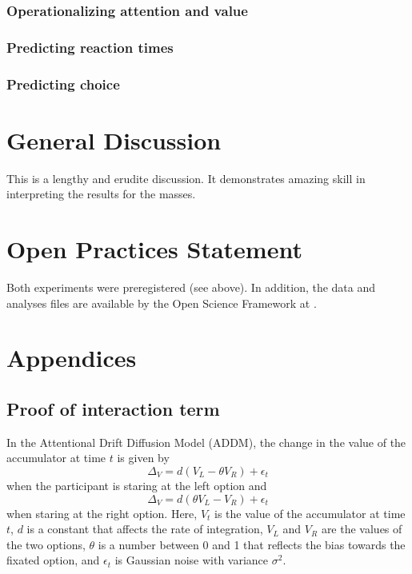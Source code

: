 \documentclass[doc, a4paper, apacite]{apa6}
\begin{document}
\subsubsection{Operationalizing attention and value}

\subsubsection{Predicting reaction times}

\subsubsection{Predicting choice}

\section{General Discussion}
This is a lengthy and erudite discussion.  It demonstrates amazing
skill in interpreting the results for the masses.

\section{Open Practices Statement}
Both experiments were preregistered (see above). In addition, the data and analyses files are available by the Open Science Framework at \url{}. 

\clearpage
\newpage



\clearpage
\newpage
\section{Appendices}
\subsection{Proof of interaction term}
In the Attentional Drift Diffusion Model (ADDM), the change in the value of the accumulator at time $t$ is given by 
\begin{equation}
	\Delta_V = d(V_L - \theta V_R) + \epsilon_t
\end{equation}
when the participant is staring at the left option and
\begin{equation}
	\Delta_V = d(\theta V_L - V_R) + \epsilon_t
\end{equation}
when staring at the right option. Here, $V_t$ is the value of the accumulator at time $t$, $d$ is a constant that affects the rate of integration, $V_L$ and $V_R$ are the values of the two options, $\theta$ is a number between 0 and 1 that reflects the bias towards the fixated option, and $\epsilon_t$ is Gaussian noise with variance $\sigma^2$. 
\end{document}
